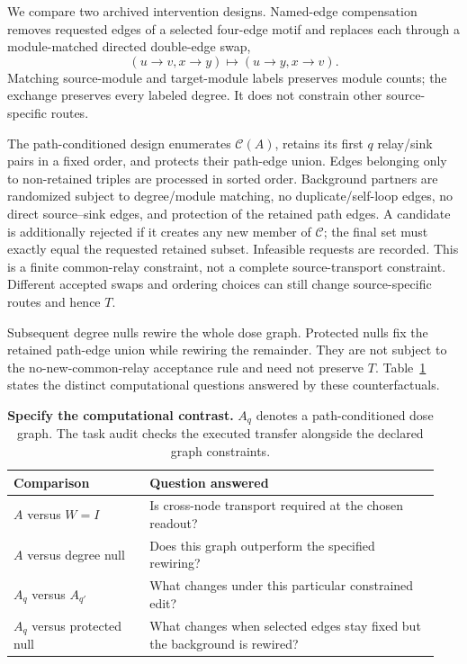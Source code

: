 We compare two archived intervention designs. Named-edge compensation
removes requested edges of a selected four-edge motif and replaces each
through a module-matched directed double-edge swap,
\begin{equation}
 (u\!\to\!v,x\!\to\!y)
 \longmapsto (u\!\to\!y,x\!\to\!v).
 \label{eq:swap}
\end{equation}
Matching source-module and target-module labels preserves module counts;
the exchange preserves every labeled degree. It does not constrain
other source-specific routes.

The path-conditioned design enumerates $\mathcal C(A)$, retains its first
$q$ relay/sink pairs in a fixed order, and protects their path-edge union.
Edges belonging only to non-retained triples are processed in sorted order.
Background partners are randomized subject to degree/module matching,
no duplicate/self-loop edges, no direct source--sink edges, and protection
of the retained path edges. A candidate is additionally rejected if it
creates any new member of $\mathcal C$; the final set must exactly equal
the requested retained subset. Infeasible requests are recorded.
This is a finite common-relay constraint, not a complete source-transport
constraint. Different accepted swaps and ordering choices can still
change source-specific routes and hence $T$.

Subsequent degree nulls rewire the whole dose graph. Protected nulls fix
the retained path-edge union while rewiring the remainder. They are not
subject to the no-new-common-relay acceptance rule and need not preserve
$T$. Table~\ref{tab:questions} states the distinct computational questions
answered by these counterfactuals.

\begin{table}[t]
\centering
\caption{\textbf{Specify the computational contrast.} $A_q$ denotes a
path-conditioned dose graph. The task audit checks the executed transfer
alongside the declared graph constraints.}
\label{tab:questions}
\small
\begin{tabular}{@{}p{0.30\linewidth}p{0.64\linewidth}@{}}
\toprule
Comparison & Question answered \\
\midrule
$A$ versus $W=I$ & Is cross-node transport required at the chosen readout? \\[3pt]
$A$ versus degree null & Does this graph outperform the specified rewiring? \\[3pt]
$A_q$ versus $A_{q'}$ & What changes under this particular constrained edit? \\[3pt]
$A_q$ versus protected null & What changes when selected edges stay fixed but the background is rewired? \\
\bottomrule
\end{tabular}
\end{table}

